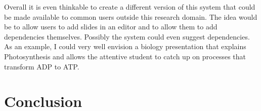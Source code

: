 \documentclass[twoside, 12pt]{article}
\newcommand{\sys}{\textsc{RPresentation}\xspace}
\begin{document}
Overall it is even thinkable to create a different version of this system that could be made available to common users outside this research domain. The idea would be to allow users to add slides in an editor and to allow them to add dependencies themselves. Possibly the system could even suggest dependencies. As an example, I could very well envision a biology presentation that explains Photosynthesis and allows the attentive student to catch up on processes that transform ADP to ATP.\\

\section{Conclusion}
\label{sec:conclusion}





\newpage

{}

\end{document}
